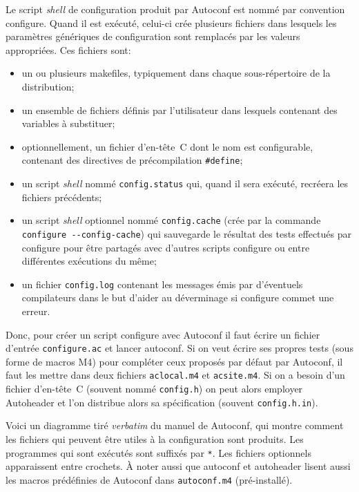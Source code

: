 \documentclass[11pt,a4paper]{article}
\newcommand{\bitem}{\item[$\bullet$]}
\begin{document}
Le script \emph{shell} de configuration produit par \textsf{Autoconf}
est nommé par convention \textsf{configure}. Quand il est exécuté,
celui-ci crée plusieurs fichiers dans lesquels les paramètres
génériques de configuration sont remplacés par les valeurs
appropriées. Ces fichiers sont:

\begin{itemize}

  \bitem un ou plusieurs makefiles, typiquement dans chaque
  sous-répertoire de la distribution;

  \bitem un ensemble de fichiers définis par l'utilisateur dans
  lesquels contenant des variables à substituer;

  \bitem optionnellement, un fichier d'en-tête~\textsf{C} dont le nom
  est configurable, contenant des directives de précompilation
  \verb+#define+;

  \bitem un script \emph{shell} nommé \texttt{config.status} qui,
  quand il sera exécuté, recréera les fichiers précédents;

  \bitem un script \emph{shell} optionnel nommé \texttt{config.cache}
  (crée par la commande \verb|configure --config-cache|) qui
  sauvegarde le résultat des tests effectués par \textsf{configure}
  pour être partagés avec d'autres scripts \textsf{configure} ou entre
  différentes exécutions du même;

  \bitem un fichier \texttt{config.log} contenant les messages émis
  par d'éventuels compilateurs dans le but d'aider au déverminage si
  \textsf{configure} commet une erreur.

\end{itemize}

Donc, pour créer un script \textsf{configure} avec \textsf{Autoconf}
il faut écrire un fichier d'entrée \texttt{configure.ac} et lancer
\textsf{autoconf}. Si on veut écrire ses propres tests (sous forme de
macros \textsf{M4}) pour compléter ceux proposés par défaut par
\textsf{Autoconf}, il faut les mettre dans deux fichiers
\texttt{aclocal.m4} et \texttt{acsite.m4}. Si on a besoin d'un fichier
d'en-tête~\textsf{C} (souvent nommé \texttt{config.h}) on peut alors
employer \textsf{Autoheader} et l'on distribue alors sa spécification
(souvent \texttt{config.h.in}).

Voici un diagramme tiré \emph{verbatim} du manuel de
\textsf{Autoconf}, qui montre comment les fichiers qui peuvent être
utiles à la configuration sont produits. Les programmes qui sont
exécutés sont suffixés par \verb+*+. Les fichiers optionnels
apparaissent entre crochets. À noter aussi que \textsf{autoconf} et
\textsf{autoheader} lisent aussi les macros prédéfinies de
\textsf{Autoconf} dans \texttt{autoconf.m4} (pré-installé).
\end{document}
